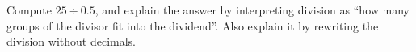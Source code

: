 Compute $25\div0.5$, and explain the answer by interpreting division as ``how many groups of the divisor fit into the dividend''. Also explain it by rewriting the division without decimals.
